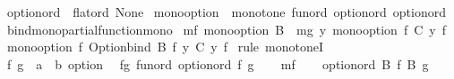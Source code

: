 \begin{isabellebody}
%
\endisatagproof
{\isafoldproof}%
%
\isadelimproof
\isanewline
%
\endisadelimproof
\isanewline
\isanewline
{}\isamarkupfalse%
\ {\isachardoublequoteopen}option{\isacharunderscore}{\kern0pt}ord\ {\isasymequiv}\ flat{\isacharunderscore}{\kern0pt}ord\ None{\isachardoublequoteclose}\isanewline
{}\isamarkupfalse%
\ {\isachardoublequoteopen}mono{\isacharunderscore}{\kern0pt}option\ {\isasymequiv}\ monotone\ {\isacharparenleft}{\kern0pt}fun{\isacharunderscore}{\kern0pt}ord\ option{\isacharunderscore}{\kern0pt}ord{\isacharparenright}{\kern0pt}\ option{\isacharunderscore}{\kern0pt}ord{\isachardoublequoteclose}\isanewline
\isanewline
{}\isamarkupfalse%
\ bind{\isacharunderscore}{\kern0pt}mono{\isacharbrackleft}{\kern0pt}partial{\isacharunderscore}{\kern0pt}function{\isacharunderscore}{\kern0pt}mono{\isacharbrackright}{\kern0pt}{\isacharcolon}{\kern0pt}\isanewline
{}\ mf{\isacharcolon}{\kern0pt}\ {\isachardoublequoteopen}mono{\isacharunderscore}{\kern0pt}option\ B{\isachardoublequoteclose}\ \ mg{\isacharcolon}{\kern0pt}\ {\isachardoublequoteopen}{\isasymAnd}y{\isachardot}{\kern0pt}\ mono{\isacharunderscore}{\kern0pt}option\ {\isacharparenleft}{\kern0pt}{\isasymlambda}f{\isachardot}{\kern0pt}\ C\ y\ f{\isacharparenright}{\kern0pt}{\isachardoublequoteclose}\isanewline
{}\ {\isachardoublequoteopen}mono{\isacharunderscore}{\kern0pt}option\ {\isacharparenleft}{\kern0pt}{\isasymlambda}f{\isachardot}{\kern0pt}\ Option{\isachardot}{\kern0pt}bind\ {\isacharparenleft}{\kern0pt}B\ f{\isacharparenright}{\kern0pt}\ {\isacharparenleft}{\kern0pt}{\isasymlambda}y{\isachardot}{\kern0pt}\ C\ y\ f{\isacharparenright}{\kern0pt}{\isacharparenright}{\kern0pt}{\isachardoublequoteclose}\isanewline
%
\isadelimproof
%
\endisadelimproof
%
\isatagproof
{}\isamarkupfalse%
\ {\isacharparenleft}{\kern0pt}rule\ monotoneI{\isacharparenright}{\kern0pt}\isanewline
\ \ \isamarkupfalse%
\ f\ g\ {\isacharcolon}{\kern0pt}{\isacharcolon}{\kern0pt}\ {\isachardoublequoteopen}{\isacharprime}{\kern0pt}a\ {\isasymRightarrow}\ {\isacharprime}{\kern0pt}b\ option{\isachardoublequoteclose}\ \isamarkupfalse%
\ fg{\isacharcolon}{\kern0pt}\ {\isachardoublequoteopen}fun{\isacharunderscore}{\kern0pt}ord\ option{\isacharunderscore}{\kern0pt}ord\ f\ g{\isachardoublequoteclose}\isanewline
\ \ \isamarkupfalse%
\ mf\isanewline
\ \ \isamarkupfalse%
\ {\isachardoublequoteopen}option{\isacharunderscore}{\kern0pt}ord\ {\isacharparenleft}{\kern0pt}B\ f{\isacharparenright}{\kern0pt}\ {\isacharparenleft}{\kern0pt}B\ g{\isacharparenright}{\kern0pt}{\isachardoublequoteclose}\ \isamarkupfalse%

\end{isabellebody}
